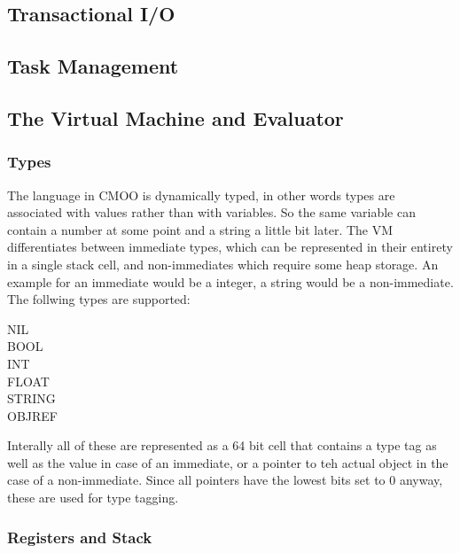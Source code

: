 \documentclass[12pt,a4paper]{article}
\begin{document}
\subsection{Transactional I/O}\label{sec:transactional_io}

\subsection{Task Management}\label{sec:task_mgmt}

\subsection{The Virtual Machine and Evaluator}\label{sec:virtual_machine}

\subsubsection{Types}\label{sec:types}

The language in CMOO is dynamically typed, in other words types are associated with values rather than with variables. So the same variable can contain a number at some point and a string a little bit later. The VM differentiates between immediate types, which can be represented in their entirety in a single stack cell, and non-immediates which require some heap storage. An example for an immediate would be a integer, a string would be a non-immediate. The follwing types are supported:

\begin{description}
\item[NIL]
\item[BOOL]
\item[INT]
\item[FLOAT]
\item[STRING]
\item[OBJREF]
\end{description}

Interally all of these are represented as a 64 bit cell that contains a type tag as well as the value in case of an immediate, or a pointer to teh actual object in the case of a non-immediate. Since all pointers have the lowest bits set to 0 anyway, these are used for type tagging.

\subsubsection{Registers and Stack}\label{sec:stack}
\end{document}
